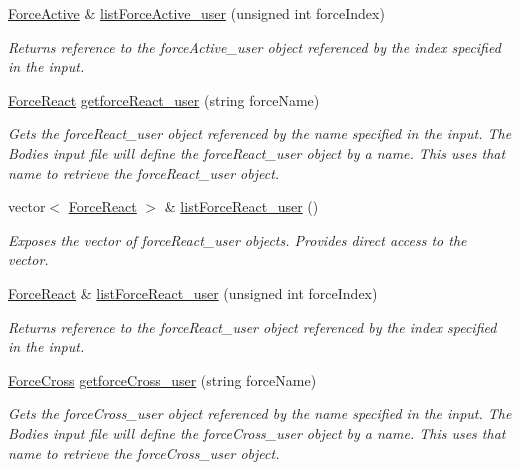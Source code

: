 \begin{DoxyCompactItemize}
\hyperlink{class_force_active}{Force\-Active} \& \hyperlink{class_system_a6166a2799a6b6419f5a91d90c98851a5}{list\-Force\-Active\-\_\-user} (unsigned int force\-Index)
\begin{DoxyCompactList}\small\item\em Returns reference to the force\-Active\-\_\-user object referenced by the index specified in the input. \end{DoxyCompactList}\item 
\hyperlink{class_force_react}{Force\-React} \hyperlink{class_system_a908dbb83c3a65a4f997881a6942ee546}{getforce\-React\-\_\-user} (string force\-Name)
\begin{DoxyCompactList}\small\item\em Gets the force\-React\-\_\-user object referenced by the name specified in the input. The Bodies input file will define the force\-React\-\_\-user object by a name. This uses that name to retrieve the force\-React\-\_\-user object. \end{DoxyCompactList}\item 
vector$<$ \hyperlink{class_force_react}{Force\-React} $>$ \& \hyperlink{class_system_a5f567e325139744bc80fd1653b50b0e3}{list\-Force\-React\-\_\-user} ()
\begin{DoxyCompactList}\small\item\em Exposes the vector of force\-React\-\_\-user objects. Provides direct access to the vector. \end{DoxyCompactList}\item 
\hyperlink{class_force_react}{Force\-React} \& \hyperlink{class_system_a863fea51fba8362e69486bdfdf632ccb}{list\-Force\-React\-\_\-user} (unsigned int force\-Index)
\begin{DoxyCompactList}\small\item\em Returns reference to the force\-React\-\_\-user object referenced by the index specified in the input. \end{DoxyCompactList}\item 
\hyperlink{class_force_cross}{Force\-Cross} \hyperlink{class_system_a05dcad8de0f203adfda7b531e39fe37e}{getforce\-Cross\-\_\-user} (string force\-Name)
\begin{DoxyCompactList}\small\item\em Gets the force\-Cross\-\_\-user object referenced by the name specified in the input. The Bodies input file will define the force\-Cross\-\_\-user object by a name. This uses that name to retrieve the force\-Cross\-\_\-user object. \end{DoxyCompactList}\item 

\end{DoxyCompactItemize}
